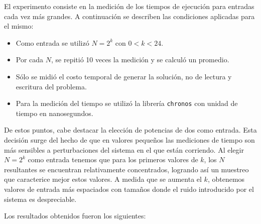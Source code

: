 	El experimento consiste en la medición de los tiempos de ejecución para
	entradas cada vez más grandes. A continuación se describen las condiciones aplicadas
	para el mismo:

	\begin{itemize}
		\item{Como entrada se utilizó $N = 2^{k}$ con $0 < k < 24.$}
		\item{Por cada $N$, se repitió 10 veces la medición y se calculó un
			promedio.}
		\item{Sólo se midió el costo temporal de generar la solución, no
			de lectura y escritura del problema.}
		\item{Para la medición del tiempo se utilizó la librería \texttt{chronos}
			con unidad de tiempo en nanosegundos.}
	\end{itemize}

	De estos puntos, cabe destacar la elección de potencias de dos como
	entrada. Esta decisión surge del hecho de que en valores pequeños las
	mediciones de tiempo son más sensibles a perturbaciones del sistema en el
	que están corriendo. Al elegir $N = 2^{k}$ como entrada tenemos que para los
	primeros valores de $k$, los $N$ resultantes se encuentran relativamente
	concentrados, logrando así un muestreo que caracterice mejor estos valores.
	A medida que se aumenta el $k$, obtenemos valores de entrada más espaciados
	con tamaños donde el ruido introducido por el sistema es despreciable.

	Los resultados obtenidos fueron los siguientes:

	\newcommand\constante{30}
	\begin{figure}[H]
		\centering
		\caption{}
		\label{fig:tiempo_base}
	\end{figure}

